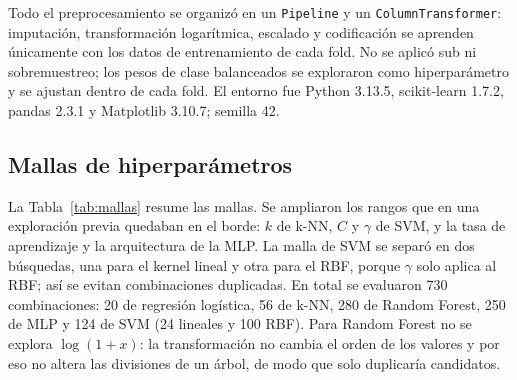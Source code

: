 \documentclass[journal]{IEEEtran}
\begin{document}
Todo el preprocesamiento se organizó en un \texttt{Pipeline} y un
\texttt{ColumnTransformer}: imputación, transformación logarítmica, escalado y
codificación se aprenden únicamente con los datos de entrenamiento de cada fold. No se
aplicó sub ni sobremuestreo; los pesos de clase balanceados se exploraron como
hiperparámetro y se ajustan dentro de cada fold. El entorno fue Python 3.13.5,
scikit-learn 1.7.2, pandas 2.3.1 y Matplotlib 3.10.7; semilla 42.

\subsection{Mallas de hiperparámetros}

La Tabla~\ref{tab:mallas} resume las mallas. Se ampliaron los rangos que en una
exploración previa quedaban en el borde: $k$ de k-NN, $C$ y $\gamma$ de SVM, y la tasa de
aprendizaje y la arquitectura de la MLP. La malla de SVM se separó en dos búsquedas, una
para el kernel lineal y otra para el RBF, porque $\gamma$ solo aplica al RBF; así se evitan
combinaciones duplicadas. En total se evaluaron 730 combinaciones: 20 de regresión
logística, 56 de k-NN, 280 de Random Forest, 250 de MLP y 124 de SVM (24 lineales y 100
RBF). Para Random Forest no se explora $\log(1+x)$: la transformación no cambia el orden de los valores y por eso no
altera las divisiones de un árbol, de modo que solo duplicaría candidatos.
\end{document}
